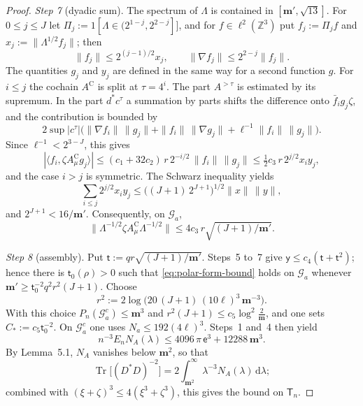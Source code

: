 \documentclass[11pt,letterpaper,reqno]{amsart}
\theoremstyle{definition}
\begin{document}
\begin{proof}
\emph{Step 7} (dyadic sum).
The spectrum of $\Lambda$ is contained in $[\mathbf m',\sqrt{13}]$.
For $0\le j\le J$ let $\Pi_j:=1[\Lambda\in(2^{1-j},2^{2-j}]]$, and for $f\in\ell^2(\mathbb Z^3)$ put $f_j:=\Pi_jf$ and $x_j:=\|\Lambda^{1/2}f_j\|$; then
\begin{equation*}
\|f_j\|\le2^{(j-1)/2}x_j,\qquad\|\nabla f_j\|\le2^{2-j}\|f_j\|.
\end{equation*}
The quantities $g_j$ and $y_j$ are defined in the same way for a second function $g$.
For $i\le j$ the cochain $A^{\mathrm C}$ is split at $\tau=4^i$.
The part $A^{>\tau}$ is estimated by its supremum.
In the part $d^*c^\tau$ a summation by parts shifts the difference onto $\bar f_ig_j\zeta$, and the contribution is bounded by
\begin{equation*}
2\sup|c^\tau|\bigl(\|\nabla f_i\|\,\|g_j\|+\|f_i\|\,\|\nabla g_j\|+\ell^{-1}\|f_i\|\,\|g_j\|\bigr).
\end{equation*}
Since $\ell^{-1}<2^{3-J}$, this gives
\begin{equation*}
|\langle f_i,\zeta A^{\mathrm C}_\mu g_j\rangle|\le(c_1+32c_2)\,r\,2^{-i/2}\,\|f_i\|\,\|g_j\|\le\tfrac12c_3\,r\,2^{j/2}x_iy_j,
\end{equation*}
and the case $i>j$ is symmetric.
The Schwarz inequality yields
\begin{equation*}
\sum_{i\le j}2^{j/2}x_iy_j\le\bigl((J+1)\,2^{J+1}\bigr)^{1/2}\|x\|\,\|y\|,
\end{equation*}
and $2^{J+1}<16/\mathbf m'$.
Consequently, on $\mathcal G_a$,
\begin{equation*}
\|\Lambda^{-1/2}\zeta A^{\mathrm C}_\mu\Lambda^{-1/2}\|\le4c_3\,r\sqrt{(J+1)/\mathbf m'}.
\end{equation*}

\emph{Step 8} (assembly).
Put $\mathsf t:=qr\sqrt{(J+1)/\mathbf m'}$.
Steps~5 to~7 give $\mathsf y\le c_4(\mathsf t+\mathsf t^2)$; hence there is $\mathsf t_0(\rho)>0$ such that \eqref{eq:polar-form-bound} holds on $\mathcal G_a$ whenever $\mathbf m'\ge\mathsf t_0^{-2}q^2r^2(J+1)$.
Choose
\begin{equation*}
r^2:=2\log\bigl(20\,(J+1)\,(10\ell)^3\,\mathbf m^{-3}\bigr).
\end{equation*}
With this choice $P_n(\mathcal G_a^c)\le\mathbf m^3$ and $r^2(J+1)\le c_5\log^2\frac2{\mathbf m}$, and one sets $C_*:=c_5\mathsf t_0^{-2}$.
On $\mathcal G_a^c$ one uses $N_a\le192(4\ell)^3$.
Steps~1 and~4 then yield
\begin{equation*}
n^{-3}E_nN_A(\lambda)\le4096\,\pi\,\mathsf e^3+12288\,\mathbf m^3.
\end{equation*}
By Lemma~5.1, $N_A$ vanishes below $\mathbf m^2$, so that
\begin{equation*}
\operatorname{Tr}\bigl[(D^*D)^{-2}\bigr]=2\int_{\mathbf m^2}^\infty\lambda^{-3}N_A(\lambda)\,\mathrm d\lambda;
\end{equation*}
combined with $(\xi+\zeta)^3\le4(\xi^3+\zeta^3)$, this gives the bound on $\mathsf T_n$.
\end{proof}
\end{document}
